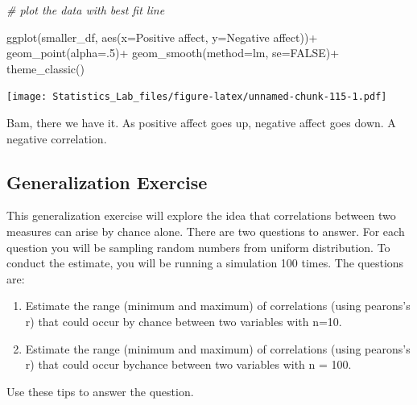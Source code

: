 \documentclass[
]{book}
\newenvironment{Shaded}{\begin{snugshade}}{\end{snugshade}}
\newcommand{\AttributeTok}[1]{\textcolor[rgb]{0.77,0.63,0.00}{#1}}
\newcommand{\CommentTok}[1]{\textcolor[rgb]{0.56,0.35,0.01}{\textit{#1}}}
\newcommand{\ConstantTok}[1]{\textcolor[rgb]{0.00,0.00,0.00}{#1}}
\newcommand{\DecValTok}[1]{\textcolor[rgb]{0.00,0.00,0.81}{#1}}
\newcommand{\FunctionTok}[1]{\textcolor[rgb]{0.00,0.00,0.00}{#1}}
\newcommand{\NormalTok}[1]{#1}
\newcommand{\SpecialCharTok}[1]{\textcolor[rgb]{0.00,0.00,0.00}{#1}}
\newcommand{\StringTok}[1]{\textcolor[rgb]{0.31,0.60,0.02}{#1}}
\begin{document}
\begin{Shaded}
\begin{Highlighting}[]
\CommentTok{\# plot the data with best fit line}

\FunctionTok{ggplot}\NormalTok{(smaller\_df, }\FunctionTok{aes}\NormalTok{(}\AttributeTok{x=}\StringTok{\textasciigrave{}}\AttributeTok{Positive affect}\StringTok{\textasciigrave{}}\NormalTok{,}
                     \AttributeTok{y=}\StringTok{\textasciigrave{}}\AttributeTok{Negative affect}\StringTok{\textasciigrave{}}\NormalTok{))}\SpecialCharTok{+}
  \FunctionTok{geom\_point}\NormalTok{(}\AttributeTok{alpha=}\NormalTok{.}\DecValTok{5}\NormalTok{)}\SpecialCharTok{+}
  \FunctionTok{geom\_smooth}\NormalTok{(}\AttributeTok{method=}\NormalTok{lm, }\AttributeTok{se=}\ConstantTok{FALSE}\NormalTok{)}\SpecialCharTok{+}
  \FunctionTok{theme\_classic}\NormalTok{()}
\end{Highlighting}
\end{Shaded}

\texttt{[image: Statistics\_Lab\_files/figure-latex/unnamed-chunk-115-1.pdf]}

Bam, there we have it. As positive affect goes up, negative affect goes down. A negative correlation.

\hypertarget{generalization-exercise-2}{%
\subsection{Generalization Exercise}\label{generalization-exercise-2}}

This generalization exercise will explore the idea that correlations between two measures can arise by chance alone. There are two questions to answer. For each question you will be sampling random numbers from uniform distribution. To conduct the estimate, you will be running a simulation 100 times. The questions are:

\begin{enumerate}
\def\labelenumi{\arabic{enumi}.}
\item
  Estimate the range (minimum and maximum) of correlations (using pearons's r) that could occur by chance between two variables with n=10.
\item
  Estimate the range (minimum and maximum) of correlations (using pearons's r) that could occur bychance between two variables with n = 100.
\end{enumerate}

Use these tips to answer the question.
\end{document}

